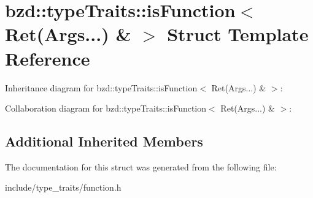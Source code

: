 \hypertarget{structbzd_1_1typeTraits_1_1isFunction_3_01Ret_07Args_8_8_8_08_01_6_01_4}{}\section{bzd\+:\+:type\+Traits\+:\+:is\+Function$<$ Ret(Args...) \& $>$ Struct Template Reference}
\label{structbzd_1_1typeTraits_1_1isFunction_3_01Ret_07Args_8_8_8_08_01_6_01_4}


Inheritance diagram for bzd\+:\+:type\+Traits\+:\+:is\+Function$<$ Ret(Args...) \& $>$\+:


Collaboration diagram for bzd\+:\+:type\+Traits\+:\+:is\+Function$<$ Ret(Args...) \& $>$\+:
\subsection*{Additional Inherited Members}


The documentation for this struct was generated from the following file\+:\begin{DoxyCompactItemize}
\item 
include/type\+\_\+traits/function.\+h\end{DoxyCompactItemize}
